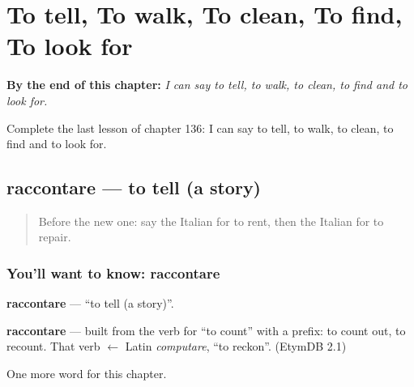 
\chapter{To tell, To walk, To clean, To find, To look for}
\label{ch:it-to-tell-to-walk-to-clean-to-find-to-look-for}

\begin{chapteropening}
\textbf{By the end of this chapter:} \emph{I can say to tell, to walk, to clean, to find and to look for.}

Complete the last lesson of chapter 136: I can say to tell, to walk, to clean, to find and to look for.
\end{chapteropening}

\section[raccontare]{raccontare — to tell (a story)}

\label{lesson:IT-C136-raccontare}



\begin{quote}
Before the new one: say the Italian for to rent, then the Italian for to repair.
\end{quote}

\subsection*{You'll want to know: raccontare}
\textbf{raccontare} — \textquotedblleft{}to tell (a story)\textquotedblright{}.

\begin{cousinweb}
\textbf{raccontare} — built from the verb for \textquotedblleft{}to count\textquotedblright{} with a prefix: to count out, to recount. That verb $\leftarrow$ Latin \emph{computare}, \textquotedblleft{}to reckon\textquotedblright{}. (EtymDB 2.1)
\end{cousinweb}

\begin{grammarlens}[title={What you've built}]
One more word for this chapter.
\end{grammarlens}

